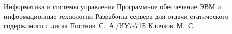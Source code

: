 \documentclass{bmstu}
\begin{document}
	
\makecourseworktitle
	{Информатика и системы управления}
	{Программное обеспечение ЭВМ и информационные технологии}
	{Разработка сервера для отдачи статического содержимого с диска}
	{Постнов~С.~А./ИУ7-71Б}
	{Клочков~М.~С.} 
	{}{}{}

\maketableofcontents








\makebibliography
\end{document}
